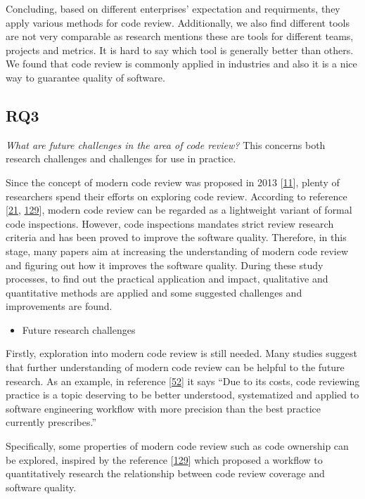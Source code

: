 \documentclass[]{book}
\providecommand{\tightlist}{%
  \setlength{\itemsep}{0pt}\setlength{\parskip}{0pt}}
\begin{document}
Concluding, based on different enterprises' expectation and requirments,
they apply various methods for code review. Additionally, we also find
different tools are not very comparable as research mentions these are
tools for different teams, projects and metrics. It is hard to say which
tool is generally better than others. We found that code review is
commonly applied in industries and also it is a nice way to guarantee
quality of software.

\subsection{RQ3}\label{rq3}

\emph{What are future challenges in the area of code review?} This
concerns both research challenges and challenges for use in practice.

Since the concept of modern code review was proposed in 2013
{[}\protect\hyperlink{ref-bacchelli2013expectations}{11}{]}, plenty of
researchers spend their efforts on exploring code review. According to
reference {[}\protect\hyperlink{ref-beller2014modern}{21},
\protect\hyperlink{ref-mcintosh2014impact}{129}{]}, modern code review
can be regarded as a lightweight variant of formal code inspections.
However, code inspections mandates strict review research criteria and
has been proved to improve the software quality. Therefore, in this
stage, many papers aim at increasing the understanding of modern code
review and figuring out how it improves the software quality. During
these study processes, to find out the practical application and impact,
qualitative and quantitative methods are applied and some suggested
challenges and improvements are found.

\begin{itemize}
\tightlist
\item
  Future research challenges
\end{itemize}

Firstly, exploration into modern code review is still needed. Many
studies suggest that further understanding of modern code review can be
helpful to the future research. As an example, in reference
{[}\protect\hyperlink{ref-czerwonka2015code}{52}{]} it says ``Due to its
costs, code reviewing practice is a topic deserving to be better
understood, systematized and applied to software engineering workflow
with more precision than the best practice currently prescribes.''

Specifically, some properties of modern code review such as code
ownership can be explored, inspired by the reference
{[}\protect\hyperlink{ref-mcintosh2014impact}{129}{]} which proposed a
workflow to quantitatively research the relationship between code review
coverage and software quality.
\end{document}
